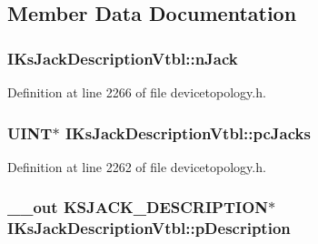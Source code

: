 \subsection{Member Data Documentation}
\subsubsection[{\texorpdfstring{n\+Jack}{nJack}}]{ I\+Ks\+Jack\+Description\+Vtbl\+::n\+Jack}\hypertarget{struct_i_ks_jack_description_vtbl_ada3ed1b262f2a2cf83b257e55bddd609}{}\label{struct_i_ks_jack_description_vtbl_ada3ed1b262f2a2cf83b257e55bddd609}


Definition at line 2266 of file devicetopology.\+h.

\subsubsection[{\texorpdfstring{pc\+Jacks}{pcJacks}}]{ {\bf U\+I\+NT}$\ast$ I\+Ks\+Jack\+Description\+Vtbl\+::pc\+Jacks}\hypertarget{struct_i_ks_jack_description_vtbl_a4019c34eccc2a12e2ca3e8a79aed7f82}{}\label{struct_i_ks_jack_description_vtbl_a4019c34eccc2a12e2ca3e8a79aed7f82}


Definition at line 2262 of file devicetopology.\+h.

\subsubsection[{\texorpdfstring{p\+Description}{pDescription}}]{ {\bf \+\_\+\+\_\+out} {\bf K\+S\+J\+A\+C\+K\+\_\+\+D\+E\+S\+C\+R\+I\+P\+T\+I\+ON}$\ast$ I\+Ks\+Jack\+Description\+Vtbl\+::p\+Description}\hypertarget{struct_i_ks_jack_description_vtbl_ae550a3f5b82987f5b01120f1ebd6333b}{}\label{struct_i_ks_jack_description_vtbl_ae550a3f5b82987f5b01120f1ebd6333b}


